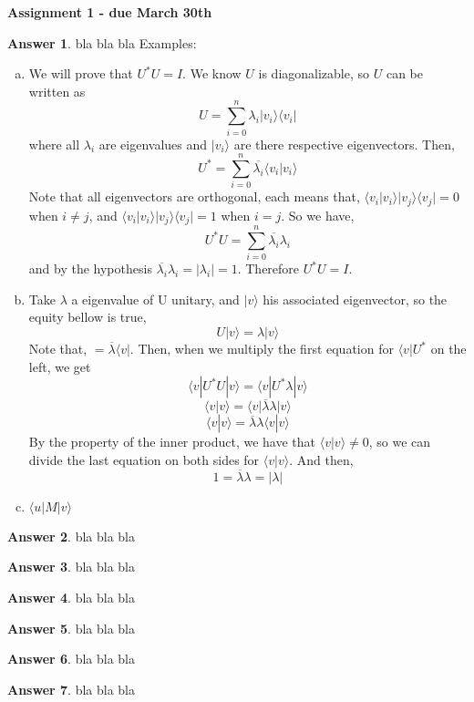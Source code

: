 \documentclass[12pt]{article}
\newcommand{\ket}[1]{|#1\rangle}
\newcommand{\bra}[1]{\langle#1|}
\newcommand{\ketbra}[2]{| #1 \rangle \langle #2 |}
\newcommand{\braket}[2]{\langle  #1 |#2 \rangle}
\theoremstyle{plain}
\theoremstyle{definition}
\newtheorem{ans}{Answer}
\begin{document}
\begin{center}
\Large \textbf{{Assignment 1 - due March 30th}}
\end{center} 


\begin{ans}
 bla bla bla
 Examples:
 \begin{enumerate}[(a)]
 	\item We will prove that $U^{*}U = I$. We know $U$ is diagonalizable, so $U$ can be written as \[U = \sum_{i=0}^{n} \lambda_i \ketbra{v_i}{v_i}\] where
			all $\lambda_i$ are eigenvalues and $\ket{v_i}$ are there respective eigenvectors. 
			Then, \[ U^{*} = \sum_{i=0}^{n} \overline{\lambda_i} \braket{v_i}{v_i}\]
			Note that all eigenvectors are orthogonal, each means that, $\braket{v_i}{v_i} \ketbra{v_j}{v_j} = 0$ when $i \neq j$, and $\braket{v_i}{v_i} \ketbra{v_j}{v_j} = 1$
			when $i = j$. So we have, \[ U^{*}U = \sum_{i=0}^{n} \overline{\lambda_i} \lambda_i\] and by the hypothesis
			$\overline{\lambda_i} \lambda_i = \left\lvert \lambda_i \right\rvert = 1$. Therefore $ U^{*}U = I$.
 	\item Take $\lambda$ a eigenvalue of U unitary, and $\ket{v}$ his associated eigenvector, so the equity bellow
			is true, \[ U \ket{v} = \lambda\ket{v} \]
			Note that, $ = \overline{\lambda}\bra{v}$.
			Then, when we multiply the first equation for $\bra{v}U^{*}$ on the left, we get 
			\[ \bra{v}U^{*} U \ket{v} = \bra{v}U^{*} \lambda \ket{v}\]
			\[ \braket{v}{v} = \bra{v}\overline{\lambda}\lambda \ket{v}\]
			\[ \braket{v}{v} = \overline{\lambda}\lambda \braket{v}{v}\]
			By the property of the inner product, we have that $\braket{v}{v} \neq 0$, so we can divide the last
			equation on both sides for $\braket{v}{v}$. And then, 
			\[ 1 = \overline{\lambda}\lambda = \left\lvert \lambda \right\rvert\]
 	\item $\bra u M \ket v$
 \end{enumerate}
 
\end{ans}

\noindent \hrulefill

\begin{ans}
 bla bla bla
\end{ans}

\noindent \hrulefill

\begin{ans}
 bla bla bla
\end{ans}

\noindent \hrulefill

\begin{ans}
 bla bla bla
\end{ans}

\noindent \hrulefill

\begin{ans}
 bla bla bla
\end{ans}

\noindent \hrulefill

\begin{ans}
 bla bla bla
\end{ans}

\noindent \hrulefill

\begin{ans}
 bla bla bla
\end{ans}
\end{document}
